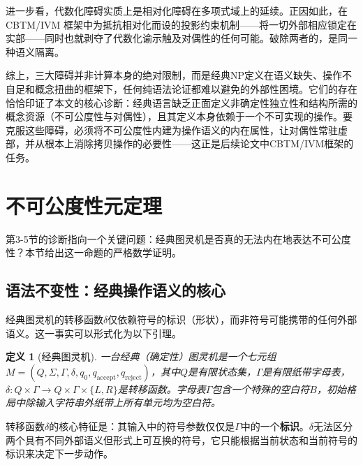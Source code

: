 \documentclass{ctexart}
\newtheorem{definition}[theorem]{定义}
\begin{document}
	进一步看，代数化障碍实质上是相对化障碍在多项式域上的延续。正因如此，在 CBTM/IVM 框架中为抵抗相对化而设的投影约束机制——将一切外部相应锁定在实部——同时也就剥夺了代数化谕示触及对偶性的任何可能。破除两者的，是同一种语义隔离。
	
	综上，三大障碍并非计算本身的绝对限制，而是经典NP定义在语义缺失、操作不自足和概念扭曲的框架下，任何纯语法论证都难以避免的外部性困境。它们的存在恰恰印证了本文的核心诊断：经典语言缺乏正面定义非确定性独立性和结构所需的概念资源（不可公度性与对偶性），且其定义本身依赖于一个不可实现的操作。要克服这些障碍，必须将不可公度性内建为操作语义的内在属性，让对偶性常驻虚部，并从根本上消除拷贝操作的必要性——这正是后续论文中CBTM/IVM框架的任务。
	
	\section{不可公度性元定理}
	
	第3-5节的诊断指向一个关键问题：经典图灵机是否真的无法内在地表达不可公度性？本节给出这一命题的严格数学证明。
	
	\subsection{语法不变性：经典操作语义的核心}
	
	经典图灵机的转移函数$\delta$仅依赖符号的标识（形状），而非符号可能携带的任何外部语义。这一事实可以形式化为以下引理。
	
	\begin{definition}[经典图灵机]
		一台经典（确定性）图灵机是一个七元组$M = (Q, \Sigma, \Gamma, \delta, q_0, q_{\text{accept}}, q_{\text{reject}})$，其中$Q$是有限状态集，$\Gamma$是有限纸带字母表，$\delta: Q \times \Gamma \to Q \times \Gamma \times \{L, R\}$是转移函数。字母表$\Gamma$包含一个特殊的空白符$B$，初始格局中除输入字符串外纸带上所有单元均为空白符。
	\end{definition}
	
	转移函数$\delta$的核心特征是：其输入中的符号参数仅仅是$\Gamma$中的一个\textbf{标识}。$\delta$无法区分两个具有不同外部语义但形式上可互换的符号，它只能根据当前状态和当前符号的标识来决定下一步动作。
	
\end{document}
